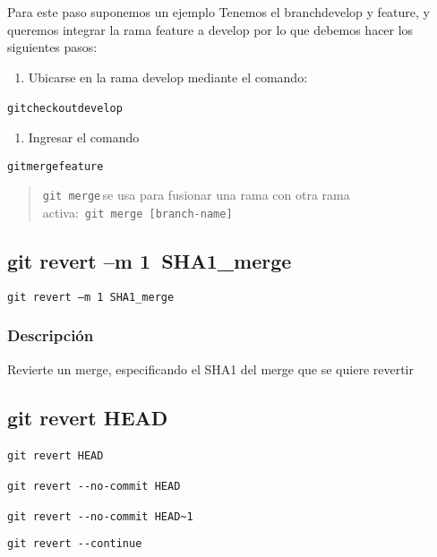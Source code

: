 \documentclass[
  a2paper,
]{article}
\providecommand{\tightlist}{%
  \setlength{\itemsep}{0pt}\setlength{\parskip}{0pt}}\usepackage{longtable,booktabs,array}
\begin{document}
Para este paso suponemos un ejemplo Tenemos el branchdevelop y feature,
y queremos integrar la rama feature a develop por lo que debemos hacer
los siguientes pasos:~~

\begin{enumerate}
\def\labelenumi{\arabic{enumi}.}
\tightlist
\item
  Ubicarse en la rama develop mediante el comando:
\end{enumerate}

\texttt{gitcheckoutdevelop}~~

\begin{enumerate}
\def\labelenumi{\arabic{enumi}.}
\setcounter{enumi}{1}
\tightlist
\item
  Ingresar el comando~~
\end{enumerate}

\texttt{gitmergefeature}

\begin{quote}
\texttt{git\ merge}\,se usa para fusionar una rama con otra rama
activa:~\texttt{git\ merge\ {[}branch-name{]}}
\end{quote}

\hypertarget{git-revert-m-1-sha1_merge}{%
\subsection{git revert --m
1~SHA1\_merge}\label{git-revert-m-1-sha1_merge}}

\texttt{git\ revert\ –m\ 1~SHA1\_merge}

\hypertarget{descripciuxf3n-2}{%
\subsubsection{Descripción}\label{descripciuxf3n-2}}

Revierte un merge, especificando el SHA1 del merge que se quiere
revertir

\hypertarget{git-revert-head}{%
\subsection{git revert HEAD}\label{git-revert-head}}

\texttt{git\ revert\ HEAD}~~

\texttt{git\ revert\ -\/-no-commit\ HEAD}~~

\texttt{git\ revert\ -\/-no-commit\ HEAD\textasciitilde{}1}~~

\texttt{git\ revert\ -\/-continue}
\end{document}
